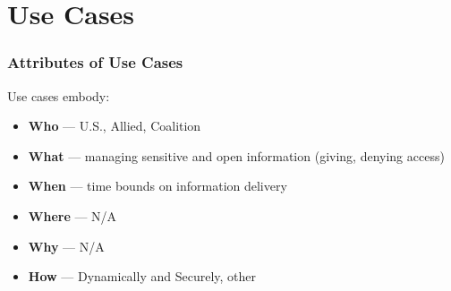 \documentclass[t,handout]{beamer}
\begin{document}
\section{Use Cases}

\begin{frame}
\frametitle{Attributes of Use Cases}
Use cases embody:
\begin{itemize}
\item {\bf Who} --- U.S., Allied, Coalition
\item {\bf What} --- managing sensitive and open information (giving, denying access)
\item {\bf When} --- time bounds on information delivery
\item {\bf Where} --- N/A
\item {\bf Why} --- N/A
\item {\bf How} --- Dynamically and Securely, other
\end{itemize}
\end{frame}

\end{document}
